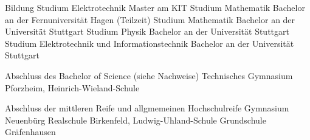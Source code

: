 \begin{rubric}{\textcolor{black!20!blue!100}{Bildung}}%
	\entry*[10/2024 --- 07/2025]
		Studium Elektrotechnik Master am KIT
	\entry*[04/2018 --- 2019]
		Studium Mathematik Bachelor an der Fernuniversität Hagen (Teilzeit)
	\entry*[10/2014 --- 03/2018]
		Studium Mathematik Bachelor an der Universität Stuttgart
	\entry*[10/2013 --- 09/2016]
		Studium Physik Bachelor an der Universität Stuttgart
	\entry*[10/2012 --- 08/2016]
		Studium Elektrotechnik und Informationstechnik Bachelor an der Universität Stuttgart
		
		Abschluss des Bachelor of Science (siehe Nachweise)
	\entry*[09/2009 --- 06/2012]
		Technisches Gymnasium Pforzheim, Heinrich-Wieland-Schule
		
		Abschluss der mittleren Reife und allgmemeinen Hochschulreife
	\entry*[09/2005 --- 07/2009]
		Gymnasium Neuenbürg
	\entry*[09/2004 --- 07/2005]
		Realschule Birkenfeld, Ludwig-Uhland-Schule
	\entry*[09/2000 --- 07/2004]
		Grundschule Gräfenhausen
\end{rubric}